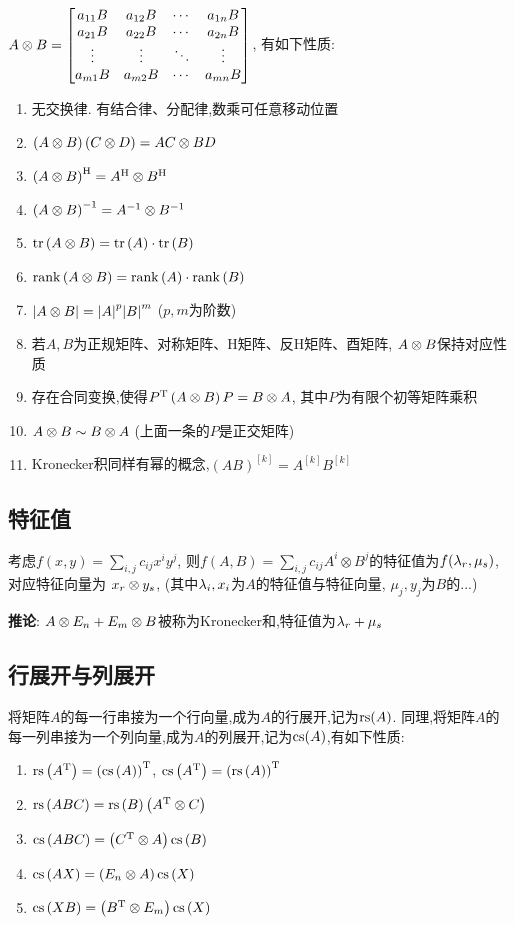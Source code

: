\documentclass{matrix-review}
\begin{document}
$A \otimes B=\begin{bmatrix}a_{11}B & a_{12}B & \cdots & a_{1n}B \\
        a_{21}B & a_{22}B & \cdots & a_{2n}B \\
        \vdots & \vdots & \ddots & \vdots \\
        a_{m1}B & a_{m2}B & \cdots & a_{mn}B \\\end{bmatrix}$, 有如下性质:
\begin{enumerate}
    \item 无交换律. 有结合律、分配律,数乘可任意移动位置
    \item $\left(A \otimes B\right)\left(C \otimes D\right) = AC \otimes BD$  \important
    \item $\left(A \otimes B\right)^{\mathrm{H}} = A^{\mathrm{H}} \otimes B^{\mathrm{H}}$
    \item $\left(A \otimes B\right)^{-1} = A^{-1} \otimes B^{-1}$
    \item $\mathrm{tr}\left(A \otimes B\right) = \mathrm{tr}\left(A\right)\cdot\mathrm{tr}\left(B\right)$
    \item $\mathrm{rank}\left(A \otimes B\right) = \mathrm{rank}\left(A\right)\cdot\mathrm{rank}\left(B\right)$
    \item $|A \otimes B| = {|A|}^p{|B|}^m$ ($p,m$为阶数)
    \item 若$A,B$为正规矩阵、对称矩阵、H矩阵、反H矩阵、酉矩阵, $A \otimes B$保持对应性质
    \item 存在合同变换,使得$P^{\mathrm{T}}\left(A \otimes B\right)P=B \otimes A$, 其中$P$为有限个初等矩阵乘积
    \item $A \otimes B\sim B \otimes A$ (上面一条的$P$是正交矩阵)
    \item Kronecker积同样有幂的概念,$\left(AB\right)^{[k]}=A^{[k]}B^{[k]}$
\end{enumerate}

\subsection{特征值}
考虑$\displaystyle f(x,y)=\sum_{i,j}c_{ij}x^iy^j$,
则$\displaystyle f(A,B)=\sum_{i,j}c_{ij}A^i\otimes B^j$的特征值为$f(\lambda_r,\mu_s)$, 对应特征向量为 $x_r \otimes y_s$,
(其中$\lambda_i,x_i$为$A$的特征值与特征向量, $\mu_j,y_j$为$B$的...)

\textbf{推论}: $A \otimes E_n+E_m \otimes B$被称为Kronecker和,特征值为$\lambda_r+\mu_s$

\subsection{行展开与列展开}
\newcommand{\rs}[1]{\mr{rs}\left(#1\right)}
\newcommand{\cs}[1]{\mr{cs}\left(#1\right)}
将矩阵$A$的每一行串接为一个行向量,成为$A$的行展开,记为$\mathrm{rs}(A)$.
同理,将矩阵$A$的每一列串接为一个列向量,成为$A$的列展开,记为$\mathrm{cs}(A)$,有如下性质:
\begin{enumerate}
    \item $\rs{A^\TT}=\left(\cs{A}\right)^\TT$,  $\cs{A^\TT}=\left(\rs{A}\right)^\TT$
    \item $\rs{ABC}=\rs{B}\left(\OT{A^\TT}{C}\right)$
    \item $\cs{ABC}=\left(\OT{C^\TT}{A}\right)\cs{B}$
    \item $\cs{AX}=\left(\OT{E_n}{A}\right)\cs{X}$
    \item $\cs{XB}=\left(\OT{B^\TT}{E_m}\right)\cs{X}$
\end{enumerate}
\end{document}
